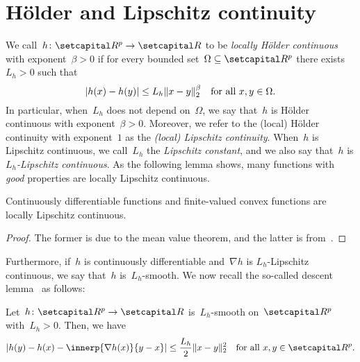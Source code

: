 \documentclass[../main]{subfiles}
\begin{document}
\section{H\"older and Lipschitz continuity}
We call~$h \colon \setR^p \to \setR$ to be \emph{locally H\"older continuous} with exponent~$\beta > 0$ if for every bounded set~$\Omega \subseteq \setR^p$ there exists~$L_h > 0$ such that
\begin{equation}
    \lvert h(x) - h(y)\rvert \le L_h \lVert x - y\rVert_2^\beta \quad \text{for all~$x, y \in \Omega$}
.\end{equation} 
In particular, when~$L_h$ does not depend on~$\Omega$, we say that~$h$ is H\"older continuous with exponent~$\beta > 0$.
Moreover, we refer to the (local) H\"older continuity with exponent~$1$ as the \emph{(local) Lipschitz continuity}.
When~$h$ is Lipschitz continuous, we call~$L_h$ the \emph{Lipschitz constant}, and we also say that~$h$ is \emph{$L_h$-Lipschitz continuous}.
As the following lemma shows, many functions with \emph{good} properties are locally Lipschitz continuous.
\begin{lemma} 
    Continuously differentiable functions and finite-valued convex functions are locally Lipschitz continuous.
\end{lemma}
\begin{proof}
    The former is due to the mean value theorem, and the latter is from~\cite{WayneStateUniversity1972}.
\end{proof}

Furthermore, if~$h$ is continuously differentiable and~$\nabla h$ is $L_h$-Lipschitz continuous, we say that~$h$ is~$L_h$-smooth.
We now recall the so-called descent lemma~\cite[Proposition A.24]{Bertsekas1999} as follows:
\begin{lemma} 
    Let~$h \colon \setR^p \to \setR$ is~$L_h$-smooth on~$\setR^p$ with~$L_h > 0$.
    Then, we have
    \begin{equation}
        \abs{h(y) - h(x) - \innerp{\nabla h(x)}{y - x}} \le \frac{L_h}{2} \norm{x - y}_2^2 \forallcondition{x, y \in \setR^p}
    .\end{equation} 
\end{lemma}
\end{document}
